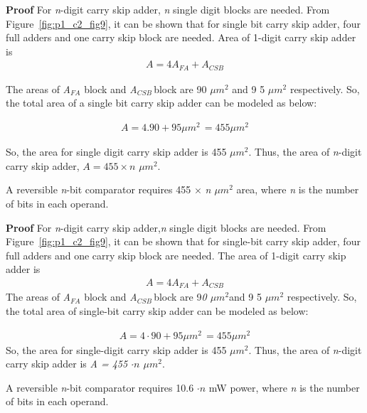 \noindent \textbf{Proof} For {\it n}-digit carry skip adder, {\it n} single digit blocks are needed. From Figure~\ref{fig:p1_c2_fig9}, it can be shown that for single bit carry skip adder, four full adders and one carry skip block are needed. Area of {1}-digit carry skip adder is
\begin{align*}
A = 4A{}_{FA} + A{}_{CSB}
\end{align*}


The areas of {\it A${}_{FA}$} block and {\it A${}_{CSB\ }$}block are { 90 $\mu m{}^{2}$} and 9{ 5 $\mu m{}^{2}$} respectively. So, the total area of a single bit carry skip adder can be modeled as below:

\begin{align*}
A = 4 . 90 + 95 \mu m{}^{2\ }=455 \mu m{}^{2}
\end{align*}

So, the area for single digit carry skip adder is {455 $\mu m{}^{2}$. }Thus, the area of {\it n}-digit carry skip adder, {$ A = 455 \times n$  $\mu m{}^{2}$}.


\begin{property}\textnormal{
		A reversible {\it n}-bit comparator requires 455 ${\times}$ {\it n $\mu m{}^{2}$} area, where {\it n} is the number of bits in each operand.}
\end{property}

\noindent \textbf{Proof}
For {\it n}-digit carry skip adder,{\it n} single digit blocks are needed. From Figure~\ref{fig:p1_c2_fig9}, it can be shown that for single-bit carry skip adder, four full adders and one carry skip block are needed. The area of {1}-digit carry skip adder is
\begin{align*}
A = 4A{}_{FA} + A{}_{CSB}
\end{align*}
\textnormal{The areas of {\it A${}_{FA}$} block and {\it A${}_{CSB\ }$}block are 9{\it 0 $\mu m{}^{2}$}and 9{ 5 $\mu m{}^{2}$} respectively. So, the total area of single-bit carry skip adder can be modeled as below:}

\begin{align*}
A = 4 \cdot 90 + 95 \mu m{}^{2\ }=455 \mu m{}^{2}
\end{align*}\textnormal{
	So, the area for single-digit carry skip adder is { 455 $\mu m{}^{2}$. }Thus, the area of {\it n}-digit carry skip adder is {\it A = 455 $\cdot n$  $\mu m{}^{2}$}}.



\begin{property}\textnormal{
		A reversible {\it n}-bit comparator requires {10.6 $\cdot n$  mW }power, where {\it n} is the number of bits in each operand.}
\end{property}

